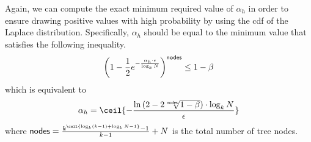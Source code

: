 		Again, we can compute the exact minimum required value of $\alpha_h$ in order to ensure drawing positive values with high probability by using the \acrshort{cdf} of the Laplace distribution.
		Specifically, $\alpha_h$ should be equal to the minimum value that satisfies the following inequality.
		\[
			\left( 1 - \frac{1}{2} e^{- \frac{\alpha_h \cdot \epsilon}{\log_{k} N}} \right)^\mathsf{nodes} \leq 1 - \beta
		\]
		which is equivalent to
		\begin{equation}\label{equation:min-mu-for-range}
			\alpha_h = \ceil{ -\frac{ \ln{ (2 - 2 \sqrt[\mathsf{nodes}]{ 1 - \beta } ) } \cdot \log_{\fanout} \domainSize }{\epsilon} }
		\end{equation}
		where $\mathsf{nodes} = \frac{ \fanout^{ \ceil{ \log_{\fanout} (\fanout - 1) + \log_{\fanout} \domainSize - 1 }} - 1}{ \fanout - 1 } + \domainSize$ is the total number of tree nodes.
